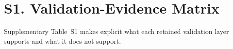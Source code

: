 \section{S1. Validation-Evidence Matrix}

Supplementary Table~S1 makes explicit what each retained validation layer supports and what it does not support.



